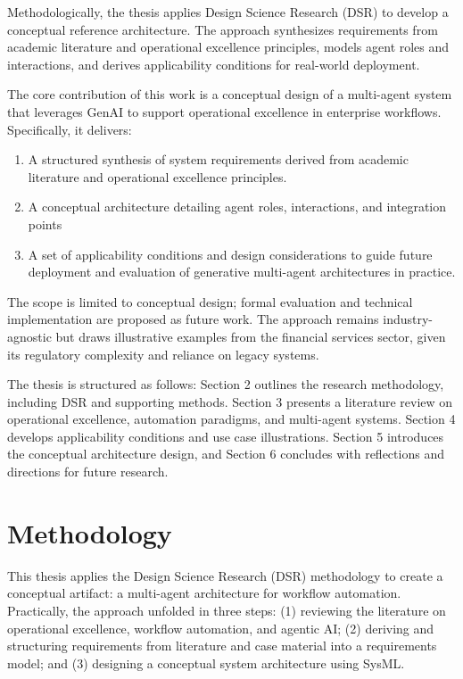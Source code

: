 Methodologically, the thesis applies Design Science Research (DSR) to develop a conceptual reference architecture. The approach synthesizes requirements from academic literature and operational excellence principles, models agent roles and interactions, and derives applicability conditions for real-world deployment.

The core contribution of this work is a conceptual design of a multi-agent system that leverages GenAI to support operational excellence in enterprise workflows. Specifically, it delivers:
\begin{enumerate}
    \item A structured synthesis of system requirements derived from academic literature and operational excellence principles.
    \item A conceptual architecture detailing agent roles, interactions, and integration points
    \item A set of applicability conditions and design considerations to guide future deployment and evaluation of generative multi-agent architectures in practice.
\end{enumerate}

The scope is limited to conceptual design; formal evaluation and technical implementation are proposed as future work. The approach remains industry-agnostic but draws illustrative examples from the financial services sector, given its regulatory complexity and reliance on legacy systems.

The thesis is structured as follows: Section 2 outlines the research methodology, including DSR and supporting methods. Section 3 presents a literature review on operational excellence, automation paradigms, and multi-agent systems. Section 4 develops applicability conditions and use case illustrations. Section 5 introduces the conceptual architecture design, and Section 6 concludes with reflections and directions for future research.

\section{Methodology}\label{sec:method}
This thesis applies the Design Science Research (DSR) methodology to create a conceptual artifact: a multi-agent architecture for workflow automation. Practically, the approach unfolded in three steps: (1) reviewing the literature on operational excellence, workflow automation, and agentic AI; (2) deriving and structuring requirements from literature and case material into a requirements model; and (3) designing a conceptual system architecture using SysML.


